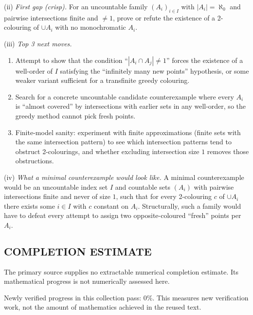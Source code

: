 (ii) \emph{First gap (crisp).} For an uncountable family $(A_i)_{i\in I}$ with $|A_i|=\aleph_0$ and pairwise intersections finite and $\neq 1$, prove or refute the existence of a 2-colouring of $\cup A_i$ with no monochromatic $A_i$.

(iii) \emph{Top 3 next moves.}
\begin{enumerate}
\item Attempt to show that the condition ``$|A_i\cap A_j|\neq 1$'' forces the existence of a well-order of $I$ satisfying the ``infinitely many new points'' hypothesis, or some weaker variant sufficient for a transfinite greedy colouring.
\item Search for a concrete uncountable candidate counterexample where every $A_i$ is ``almost covered'' by intersections with earlier sets in any well-order, so the greedy method cannot pick fresh points.
\item Finite-model sanity: experiment with finite approximations (finite sets with the same intersection pattern) to see which intersection patterns tend to obstruct 2-colourings, and whether excluding intersection size $1$ removes those obstructions.
\end{enumerate}

(iv) \emph{What a minimal counterexample would look like.} A minimal counterexample would be an uncountable index set $I$ and countable sets $(A_i)$ with pairwise intersections finite and never of size $1$, such that for every 2-colouring $c$ of $\cup A_i$ there exists some $i\in I$ with $c$ constant on $A_i$. Structurally, such a family would have to defeat every attempt to assign two opposite-coloured ``fresh'' points per $A_i$.


\subsection*{COMPLETION ESTIMATE}
The primary source supplies no extractable numerical completion estimate. Its mathematical progress is not numerically assessed here.

Newly verified progress in this collection pass: $0\%$. This measures new verification work, not the amount of mathematics achieved in the reused text.
